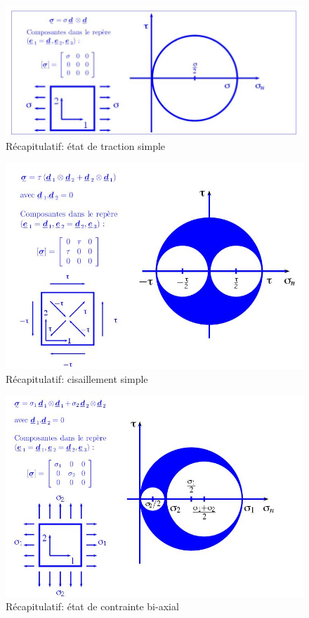 \begin{figure}[!h]
\centering
\includegraphics[scale=0.6]{./tractionsimple}
\caption{Récapitulatif: état de traction simple}
\label{fig:ts}
\end{figure}

\begin{figure}[!h]
\centering
\includegraphics[scale=0.6]{./cisaillementsimple}
\caption{Récapitulatif: cisaillement simple}
\label{fig:cs}
\end{figure}

\begin{figure}[!h]
\centering
\includegraphics[scale=0.6]{./biaxial}
\caption{Récapitulatif: état de contrainte bi-axial}
\label{fig:ba}
\end{figure}

